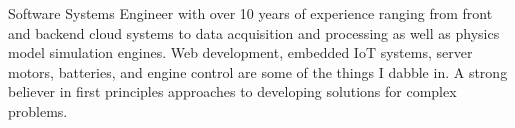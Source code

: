 \documentclass[9pt]{developercv} %
\begin{document}
\vspace{0.5cm}



\begin{minipage}[t]{0.4\textwidth} %
	\vspace{-\baselineskip} %
Software Systems Engineer with over 10 years of experience ranging from front and backend cloud systems to data acquisition and processing as well as physics model simulation engines. Web development, embedded IoT systems, server motors, batteries, and engine control are some of the things I dabble in. A strong believer in first principles approaches to developing solutions for complex problems. 
\end{minipage}
\hfill %
\begin{minipage}[t]{0.5\textwidth} %
	\vspace{-\baselineskip} %
	\begin{barchart}{5.5}
	\end{barchart}
\end{minipage}

\begin{center}
\end{center}


\end{document}
